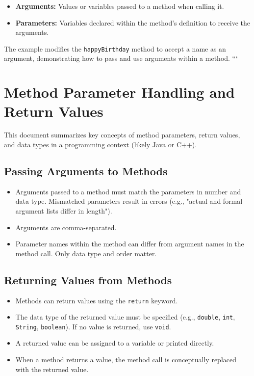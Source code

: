 \documentclass{article}
\begin{document}
\begin{itemize}
    \item \textbf{Arguments:} Values or variables passed to a method when calling it.
    \item \textbf{Parameters:} Variables declared within the method's definition to receive the arguments.
\end{itemize}

The example modifies the \texttt{happyBirthday} method to accept a name as an argument, demonstrating how to pass and use arguments within a method.
```


\section{Method Parameter Handling and Return Values}

This document summarizes key concepts of method parameters, return values, and data types in a programming context (likely Java or C++).

\subsection{Passing Arguments to Methods}

\begin{itemize}
    \item Arguments passed to a method must match the parameters in number and data type.  Mismatched parameters result in errors (e.g., "actual and formal argument lists differ in length").
    \item Arguments are comma-separated.
    \item Parameter names within the method can differ from argument names in the method call.  Only data type and order matter.
\end{itemize}

\subsection{Returning Values from Methods}

\begin{itemize}
    \item Methods can return values using the \texttt{return} keyword.
    \item The data type of the returned value must be specified (e.g., \texttt{double}, \texttt{int}, \texttt{String}, \texttt{boolean}).  If no value is returned, use \texttt{void}.
    \item A returned value can be assigned to a variable or printed directly.
    \item  When a method returns a value, the method call is conceptually replaced with the returned value.
\end{itemize}
\end{document}
